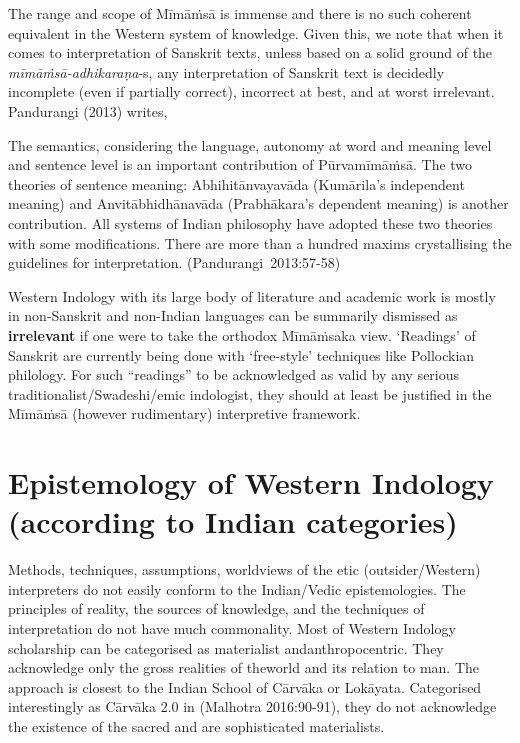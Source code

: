 The range and scope of Mīmāṁsā is immense and there is no such coherent equivalent in the Western system of knowledge. Given this, we note that when it comes to interpretation of Sanskrit texts, unless based on a solid ground of the {\sl mīmāṁsā-adhikaraṇa}-s, any interpretation of Sanskrit text is decidedly incomplete (even if partially correct), incorrect at best, and at worst irrelevant. Pandurangi (2013) writes,
\begin{myquote}
The semantics, considering the language, autonomy at word and meaning level and sentence level is an important contribution of Pūrva\-mīmāṁ\-sā. The two theories of sentence meaning: Abhihitānvayavāda (Kumārila's independent meaning) and Anvitābhidhānavāda (Prabhākara's dependent meaning) is another contribution. All systems of Indian philosophy have adopted these two theories with some modifications. There are more than a hundred maxims crystallising the guidelines for interpretation. \hfill \hbox{(Pandurangi 2013:57-58)}
\end{myquote}

Western Indology with its large body of literature and academic work is mostly in non-Sanskrit and non-Indian languages can be summarily dismissed as {\bf irrelevant} if one were to take the orthodox Mīmāṁsaka view. `Readings' of Sanskrit are currently being done with `free-style' techniques like Pollockian philology. For such ``readings'' to be acknowledged as valid by any serious traditionalist/Swadeshi/emic indologist, they should at least be justified in the Mīmāṁsā (however rudimentary) interpretive framework. 

\section*{Epistemology of Western Indology (according to Indian categories)}

Methods, techniques, assumptions, worldviews of the etic (outsider/\-Western) interpreters do not easily conform to the Indian/Vedic epistemologies. The principles of reality, the sources of knowledge, and the techniques of interpretation do not have much commonality. Most of Western Indology scholarship can be categorised as materialist and\break anthropocentric. They acknowledge only the gross realities of the\break world and its relation to man. The approach is closest to the Indian School of Cārvāka or Lokāyata. Categorised interestingly as Cārvāka 2.0 in (Malhotra 2016:90-91), they do not acknowledge the existence of the sacred and are sophisticated materialists.

